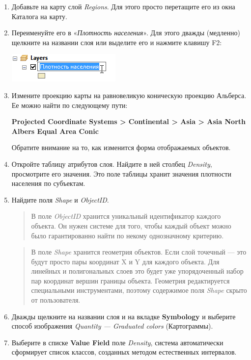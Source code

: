 \documentclass[12pt,]{book}
\begin{document}
\begin{enumerate}
\def\labelenumi{\arabic{enumi}.}
\item
  Добавьте на карту слой \emph{Regions}. Для этого просто перетащите его из окна Каталога на карту.
\item
  Переименуйте его в «\emph{Плотность населения}». Для этого дважды (медленно) щелкните на названии слоя или выделите его и нажмите клавишу F2:

  \includegraphics{images/Ex04/image8.png}
\item
  Измените проекцию карты на равновеликую коническую проекцию Альберса. Ее можно найти по следующему пути:

  \textbf{Projected Coordinate Systems \textgreater{} Continental \textgreater{} Asia \textgreater{} Asia North Albers Equal Area Conic}

  Обратите внимание на то, как изменится форма отображаемых объектов.
\item
  Откройте таблицу атрибутов слоя. Найдите в ней столбец \emph{Density}, просмотрите его значения. Это поле таблицы хранит значения плотности населения по субъектам.
\item
  Найдите поля \emph{Shape} и \emph{ObjectID}.

  \begin{quote}
  В поле \emph{ObjectID} хранится уникальный идентификатор каждого объекта. Он нужен системе для того, чтобы каждый объект можно было гарантированно найти по некому однозначному критерию.
  \end{quote}

  \begin{quote}
  В поле \emph{Shape} хранится геометрия объектов. Если слой точечный --- это будут просто пары координат X и Y для каждого объекта. Для линейных и полигональных слоев это будет уже упорядоченный набор пар координат вершин границы объекта. Геометрия редактируется специальными инструментами, поэтому содержимое поля \emph{Shape} скрыто от пользователя.
  \end{quote}
\item
  Дважды щелкните на названии слоя и на вкладке \textbf{Symbology} и выберите способ изображения \emph{Quantity --- Graduated colors} (Картограммы).
\item
  Выберите в списке \textbf{Value Field} поле \emph{Density}, система автоматически сформирует список классов, созданных методом естественных интервалов.


\end{enumerate}
\end{document}

